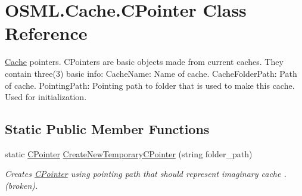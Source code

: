 \hypertarget{classOSML_1_1Cache_1_1CPointer}{}\section{O\+S\+M\+L.\+Cache.\+C\+Pointer Class Reference}
\label{classOSML_1_1Cache_1_1CPointer}


\mbox{\hyperlink{namespaceOSML_1_1Cache}{Cache}} pointers. C\+Pointers are basic objects made from current caches. They contain three(3) basic info\+: Cache\+Name\+: Name of cache. Cache\+Folder\+Path\+: Path of cache. Pointing\+Path\+: Pointing path to folder that is used to make this cache. Used for initialization.  


\subsection*{Static Public Member Functions}
\begin{DoxyCompactItemize}
\item 
static \mbox{\hyperlink{classOSML_1_1Cache_1_1CPointer}{C\+Pointer}} \mbox{\hyperlink{classOSML_1_1Cache_1_1CPointer_aeda79d16475a8f18801717b042bd6143}{Create\+New\+Temporary\+C\+Pointer}} (string folder\+\_\+path)
\begin{DoxyCompactList}\small\item\em Creates \mbox{\hyperlink{classOSML_1_1Cache_1_1CPointer}{C\+Pointer}} using pointing path that should represent imaginary cache . (broken). \end{DoxyCompactList}\end{DoxyCompactItemize}
